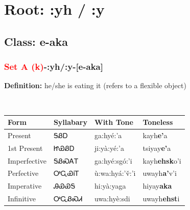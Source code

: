 \needspace{4in}
\section*{Root: :yh / :y}
\nopagebreak
{}
\needspace{3in}
\subsection*{Class: e-aka}
\nopagebreak
\needspace{2in}
\subsubsection*{\textcolor{Red}{Set A (k)}{-}\textbf{:yh/:y}{-}[e-aka]}
\nopagebreak
\textbf{Definition: } he/she is eating it (refers to a flexible object)
\\[0.5em]
\begin{tabularx}{\textwidth}{l X X X}%
\toprule%
\textbf{Form}&\textbf{Syllabary}&\textbf{With Tone}&\textbf{Toneless}\\%
\midrule%
Present&ᎦᏰᎠ&ga:hyé:’a&kayh\textbf{e'}a\\%
1st Present&ᏥᏯᏰᎠ&ji:yà:yé:’a&tsiyay\textbf{e'}a\\%
Imperfective&ᎦᏰᏍᎪᎢ&ga:hyé:sgó:’i&kayh\textbf{ehsk}o'i\\%
Perfective&ᎤᏩᏯᎥᎢ&ù:wa:hyá:’v̌:’i&uwayh\textbf{a'}v'i\\%
Imperative&ᎯᏯᏯᎦ&hi:yà:yaga&hiyay\textbf{aka}\\%
Infinitive&ᎤᏩᏰᏍᏗ&uwa:hyè:sdi&uwayh\textbf{ehst}i\\%
\bottomrule%
\end{tabularx}
\\[1em]